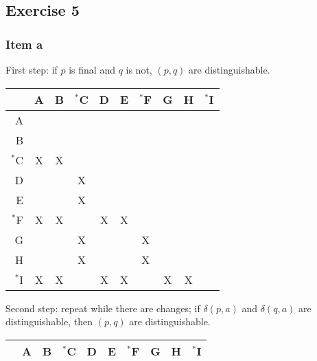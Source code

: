 \documentclass[docid=TP07]{tcom_TP}
\begin{document}
{\subsection{Exercise 5}
\subsubsection{Item a}
First step: if $p$ is final and $q$ is not, $(p,q)$ are distinguishable.
\begin{center} \begin{tabular}{r || c | c | c | c | c | c | c | c | c}
	   & A  & B  & $^*$C & D  & E  & $^*$F & G  & H  & $^*$I \\ \hline \hline
	A  & \cellcolor{gray} & \cellcolor{gray} & \cellcolor{gray} & \cellcolor{gray} & \cellcolor{gray} & \cellcolor{gray} & \cellcolor{gray} & \cellcolor{gray} & \cellcolor{gray} \\ \hline
	B  &    & \cellcolor{gray} & \cellcolor{gray} & \cellcolor{gray} & \cellcolor{gray} & \cellcolor{gray} & \cellcolor{gray} & \cellcolor{gray} & \cellcolor{gray} \\ \hline
	$^*$C & X  & X  & \cellcolor{gray} & \cellcolor{gray} & \cellcolor{gray} & \cellcolor{gray} & \cellcolor{gray} & \cellcolor{gray} & \cellcolor{gray} \\ \hline
	D  &    &    & X  & \cellcolor{gray} & \cellcolor{gray} & \cellcolor{gray} & \cellcolor{gray} & \cellcolor{gray} & \cellcolor{gray} \\ \hline
	E  &    &    & X  &    & \cellcolor{gray} & \cellcolor{gray} & \cellcolor{gray} & \cellcolor{gray} & \cellcolor{gray} \\ \hline
	$^*$F & X  & X  &    & X  & X  & \cellcolor{gray} & \cellcolor{gray} & \cellcolor{gray} & \cellcolor{gray} \\ \hline
	G  &    &    & X  &    &    & X  & \cellcolor{gray} & \cellcolor{gray} & \cellcolor{gray} \\ \hline
	H  &    &    & X  &    &    & X  &    & \cellcolor{gray} & \cellcolor{gray} \\ \hline
	$^*$I & X  & X  &    & X  & X  &    & X  & X  & \cellcolor{gray} 
\end{tabular} \end{center}
Second step: repeat while there are changes; if $\delta(p,a)$ and $\delta(q,a)$ are distinguishable, then $(p,q)$ are distinguishable.
\begin{center} \begin{tabular}{r || c | c | c | c | c | c | c | c | c}
	   & A  & B  & $^*$C & D  & E  & $^*$F & G  & H  & $^*$I \\ \hline \hline

\end{tabular}
\end{center}}
\end{document}
